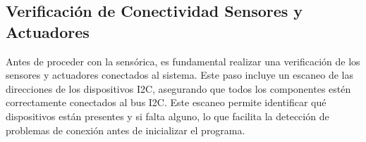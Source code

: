 \subsection{Verificación de Conectividad Sensores y Actuadores }
Antes de proceder con la sensórica, es fundamental realizar una verificación de los sensores y actuadores conectados al sistema. Este paso incluye un escaneo de las direcciones de los dispositivos I2C, asegurando que todos los componentes estén correctamente conectados al bus I2C. Este escaneo permite identificar qué dispositivos están presentes y si falta alguno, lo que facilita la detección de problemas de conexión antes de inicializar el programa.
